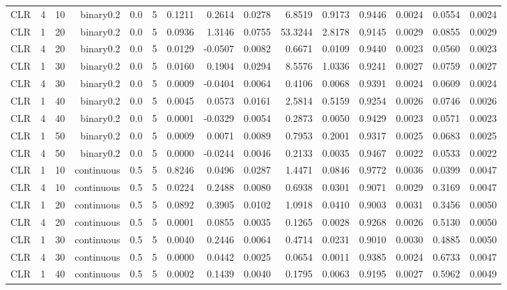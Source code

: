 \begin{longtable}{rrrrrrrrrrrrrrr}
  CLR & 4 & 10 & binary0.2 & 0.0 & 5 & 0.1211 & 0.2614 & 0.0278 & 6.8519 & 0.9173 & 0.9446 & 0.0024 & 0.0554 & 0.0024 \\ 
  CLR & 1 & 20 & binary0.2 & 0.0 & 5 & 0.0936 & 1.3146 & 0.0755 & 53.3244 & 2.8178 & 0.9145 & 0.0029 & 0.0855 & 0.0029 \\ 
  CLR & 4 & 20 & binary0.2 & 0.0 & 5 & 0.0129 & -0.0507 & 0.0082 & 0.6671 & 0.0109 & 0.9440 & 0.0023 & 0.0560 & 0.0023 \\ 
  CLR & 1 & 30 & binary0.2 & 0.0 & 5 & 0.0160 & 0.1904 & 0.0294 & 8.5576 & 1.0336 & 0.9241 & 0.0027 & 0.0759 & 0.0027 \\ 
  CLR & 4 & 30 & binary0.2 & 0.0 & 5 & 0.0009 & -0.0404 & 0.0064 & 0.4106 & 0.0068 & 0.9391 & 0.0024 & 0.0609 & 0.0024 \\ 
  CLR & 1 & 40 & binary0.2 & 0.0 & 5 & 0.0045 & 0.0573 & 0.0161 & 2.5814 & 0.5159 & 0.9254 & 0.0026 & 0.0746 & 0.0026 \\ 
  CLR & 4 & 40 & binary0.2 & 0.0 & 5 & 0.0001 & -0.0329 & 0.0054 & 0.2873 & 0.0050 & 0.9429 & 0.0023 & 0.0571 & 0.0023 \\ 
  CLR & 1 & 50 & binary0.2 & 0.0 & 5 & 0.0009 & 0.0071 & 0.0089 & 0.7953 & 0.2001 & 0.9317 & 0.0025 & 0.0683 & 0.0025 \\ 
  CLR & 4 & 50 & binary0.2 & 0.0 & 5 & 0.0000 & -0.0244 & 0.0046 & 0.2133 & 0.0035 & 0.9467 & 0.0022 & 0.0533 & 0.0022 \\ 
  CLR & 1 & 10 & continuous & 0.5 & 5 & 0.8246 & 0.0496 & 0.0287 & 1.4471 & 0.0846 & 0.9772 & 0.0036 & 0.0399 & 0.0047 \\ 
  CLR & 4 & 10 & continuous & 0.5 & 5 & 0.0224 & 0.2488 & 0.0080 & 0.6938 & 0.0301 & 0.9071 & 0.0029 & 0.3169 & 0.0047 \\ 
  CLR & 1 & 20 & continuous & 0.5 & 5 & 0.0892 & 0.3905 & 0.0102 & 1.0918 & 0.0410 & 0.9003 & 0.0031 & 0.3456 & 0.0050 \\ 
  CLR & 4 & 20 & continuous & 0.5 & 5 & 0.0001 & 0.0855 & 0.0035 & 0.1265 & 0.0028 & 0.9268 & 0.0026 & 0.5130 & 0.0050 \\ 
  CLR & 1 & 30 & continuous & 0.5 & 5 & 0.0040 & 0.2446 & 0.0064 & 0.4714 & 0.0231 & 0.9010 & 0.0030 & 0.4885 & 0.0050 \\ 
  CLR & 4 & 30 & continuous & 0.5 & 5 & 0.0000 & 0.0442 & 0.0025 & 0.0654 & 0.0011 & 0.9385 & 0.0024 & 0.6733 & 0.0047 \\ 
  CLR & 1 & 40 & continuous & 0.5 & 5 & 0.0002 & 0.1439 & 0.0040 & 0.1795 & 0.0063 & 0.9195 & 0.0027 & 0.5962 & 0.0049 \\ 

\end{longtable}
